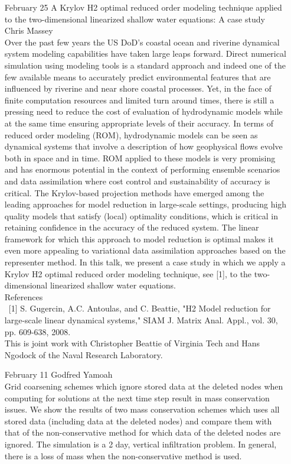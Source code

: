 \documentclass[12]{article}
\begin{document}
\begin{enumerate}
\item[February 25] A Krylov H2 optimal reduced order modeling technique applied to the two-dimensional linearized shallow water equations: A case study\\Chris Massey\\
  Over the past few years the US DoD's coastal ocean and riverine
dynamical system modeling capabilities
have taken large leaps forward. Direct numerical simulation using
modeling tools is a standard approach
and indeed one of the few available means to accurately predict
environmental features that are influenced
by riverine and near shore coastal processes. Yet, in the face of finite
computation resources and limited turn
around times, there is still a pressing need to reduce the cost of
evaluation of hydrodynamic models while at
the same time ensuring appropriate levels of their accuracy. In terms of
reduced order modeling (ROM),
hydrodynamic models can be seen as dynamical systems that involve a
description of how geophysical
flows evolve both in space and in time. ROM applied to these models is
very promising and has enormous
potential in the context of performing ensemble scenarios and data
assimilation where cost control and
sustainability of accuracy is critical. The Krylov-based projection
methods have emerged among the leading
approaches for model reduction in large-scale settings, producing high
quality models that satisfy (local)
optimality conditions, which is critical in retaining confidence in the
accuracy of the reduced system. The
linear framework for which this approach to model reduction is optimal
makes it even more appealing to
variational data assimilation approaches based on the representer
method.
In this talk, we present a case study in which we apply a Krylov H2
optimal reduced order modeling
technique, see [1], to the two-dimensional linearized shallow water
equations.\\References\\
 \ [1] S. Gugercin, A.C. Antoulas, and C. Beattie, "H2 Model reduction for
large-scale linear dynamical
systems," SIAM J. Matrix Anal. Appl., vol. 30, pp. 609-638, 2008.  \\ This is joint work with Christopher Beattie of Virginia Tech and Hans
Ngodock of the Naval Research Laboratory.

\item[February 11] Godfred Yamoah\\
  Grid coarsening schemes which ignore stored data at the deleted nodes when
computing for solutions at the next time step result in mass conservation
issues. We show the results of two mass conservation schemes which uses all
stored data (including data at the deleted nodes) and compare them with that
of the non-conservative method for which data of the deleted nodes are
ignored. The simulation is a 2 day, vertical infiltration problem. In
general, there is a loss of mass when the non-conservative method is used.

\end{enumerate}
\end{document}
